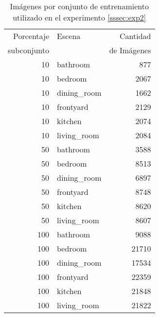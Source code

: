 

\begin{table}[h!]
	\centering
	\begin{tabular}{| r | l | r |}
		\toprule
		Porcentaje & Escena &  Cantidad \\
		subconjunto & {} &  de Imágenes \\
		\midrule
		10 &     bathroom &       877 \\
		10 &      bedroom &      2067 \\
		10 &  dining\_room &      1662 \\
		10 &    frontyard &      2129 \\
		10 &      kitchen &      2074 \\
		10 &  living\_room &      2084 \\
		\midrule
		50 &     bathroom &      3588 \\
		50 &      bedroom &      8513 \\
		50 &  dining\_room &      6897 \\
		50 &    frontyard &      8748 \\
		50 &      kitchen &      8620 \\
		50 &  living\_room &      8607 \\
		\midrule
		100 &     bathroom &      9088 \\
		100 &      bedroom &     21710 \\
		100 &  dining\_room &     17534 \\
		100 &    frontyard &     22359 \\
		100 &      kitchen &     21848 \\
		100 &  living\_room &     21822 \\
		\bottomrule
	\end{tabular}
	\caption{Imágenes por conjunto de entrenamiento utilizado en el experimento \ref{sssec:exp2}}
	\label{exp2:distribucion_clase_datasets}
\end{table}




